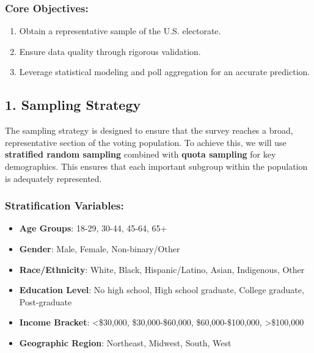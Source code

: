 \documentclass[
  letterpaper,
  DIV=11,
  numbers=noendperiod]{scrartcl}
\providecommand{\tightlist}{%
  \setlength{\itemsep}{0pt}\setlength{\parskip}{0pt}}\usepackage{longtable,booktabs,array}
\begin{document}
\subsubsection{\texorpdfstring{\textbf{Core
Objectives}:}{Core Objectives:}}\label{core-objectives}

\begin{enumerate}
\def\labelenumi{\arabic{enumi}.}
\tightlist
\item
  Obtain a representative sample of the U.S. electorate.
\item
  Ensure data quality through rigorous validation.
\item
  Leverage statistical modeling and poll aggregation for an accurate
  prediction.
\end{enumerate}

\subsection{\texorpdfstring{\textbf{1. Sampling
Strategy}}{1. Sampling Strategy}}\label{sampling-strategy}

The sampling strategy is designed to ensure that the survey reaches a
broad, representative section of the voting population. To achieve this,
we will use \textbf{stratified random sampling} combined with
\textbf{quota sampling} for key demographics. This ensures that each
important subgroup within the population is adequately represented.

\subsubsection{\texorpdfstring{\textbf{Stratification
Variables}:}{Stratification Variables:}}\label{stratification-variables}

\begin{itemize}
\tightlist
\item
  \textbf{Age Groups}: 18-29, 30-44, 45-64, 65+\\
\item
  \textbf{Gender}: Male, Female, Non-binary/Other\\
\item
  \textbf{Race/Ethnicity}: White, Black, Hispanic/Latino, Asian,
  Indigenous, Other\\
\item
  \textbf{Education Level}: No high school, High school graduate,
  College graduate, Post-graduate\\
\item
  \textbf{Income Bracket}: \textless\$30,000, \$30,000-\$60,000,
  \$60,000-\$100,000, \textgreater\$100,000\\
\item
  \textbf{Geographic Region}: Northeast, Midwest, South, West
\end{itemize}
\end{document}
